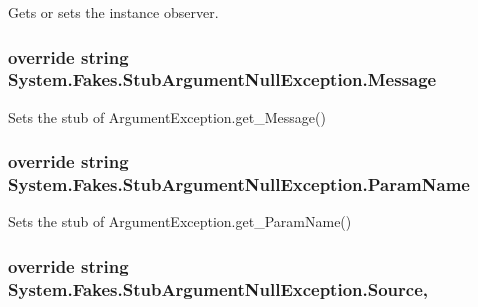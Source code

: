 Gets or sets the instance observer.

\hypertarget{class_system_1_1_fakes_1_1_stub_argument_null_exception_a7b7eed979d68ddf2c2154e118c3b4764}{
\subsubsection[{Message}]{\setlength{\rightskip}{0pt plus 5cm}override string System.\-Fakes.\-Stub\-Argument\-Null\-Exception.\-Message\hspace{0.3cm}{\ttfamily [get]}}}\label{class_system_1_1_fakes_1_1_stub_argument_null_exception_a7b7eed979d68ddf2c2154e118c3b4764}


Sets the stub of Argument\-Exception.\-get\-\_\-\-Message()

\hypertarget{class_system_1_1_fakes_1_1_stub_argument_null_exception_abd410d5f4f677608948f6edf5ab01f5c}{
\subsubsection[{Param\-Name}]{\setlength{\rightskip}{0pt plus 5cm}override string System.\-Fakes.\-Stub\-Argument\-Null\-Exception.\-Param\-Name\hspace{0.3cm}{\ttfamily [get]}}}\label{class_system_1_1_fakes_1_1_stub_argument_null_exception_abd410d5f4f677608948f6edf5ab01f5c}


Sets the stub of Argument\-Exception.\-get\-\_\-\-Param\-Name()

\hypertarget{class_system_1_1_fakes_1_1_stub_argument_null_exception_ae8698aa05d3786f41afd6a37cd59e23b}{
\subsubsection[{Source}]{\setlength{\rightskip}{0pt plus 5cm}override string System.\-Fakes.\-Stub\-Argument\-Null\-Exception.\-Source\hspace{0.3cm}{\ttfamily [get]}, {\ttfamily [set]}}}\label{class_system_1_1_fakes_1_1_stub_argument_null_exception_ae8698aa05d3786f41afd6a37cd59e23b}


